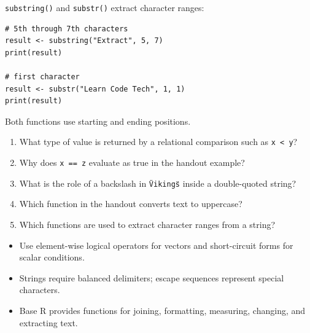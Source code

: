 \texttt{substring()} and \texttt{substr()} extract character ranges:

\begin{lstlisting}[style=dsr]
# 5th through 7th characters
result <- substring("Extract", 5, 7)
print(result)

# first character
result <- substr("Learn Code Tech", 1, 1)
print(result)
\end{lstlisting}

Both functions use starting and ending positions.

\begin{quickcheck}
\begin{enumerate}
  \item What type of value is returned by a relational comparison such as \texttt{x < y}?
  \item Why does \texttt{x == z} evaluate as true in the handout example?
  \item What is the role of a backslash in \texttt{\"Vikings\"} inside a double-quoted string?
  \item Which function in the handout converts text to uppercase?
  \item Which functions are used to extract character ranges from a string?
\end{enumerate}
\end{quickcheck}

\begin{chapterrecap}
\begin{itemize}
  \item Use element-wise logical operators for vectors and short-circuit forms for scalar conditions.
  \item Strings require balanced delimiters; escape sequences represent special characters.
  \item Base R provides functions for joining, formatting, measuring, changing, and extracting text.
\end{itemize}
\end{chapterrecap}

